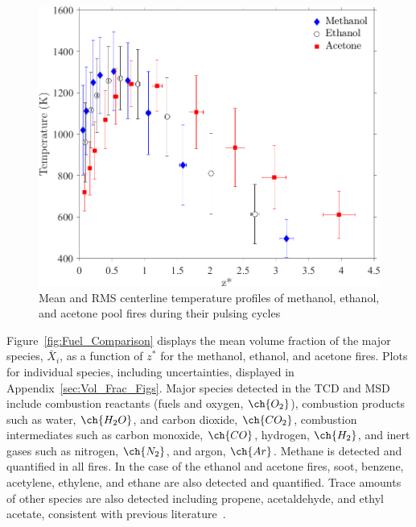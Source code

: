 \documentclass[12pt]{article}
\begin{document}
\begin{figure}[h!]
	\centering
\includegraphics[width=11.0 cm, keepaspectratio]{Temperature_Comparison.png}
	\caption[Major Species Comparison]{Mean and RMS centerline temperature profiles of methanol, ethanol, and acetone pool fires during their pulsing cycles}
	\label{fig:Temp_Comparison}
\end{figure}

Figure~\ref{fig:Fuel_Comparison} displays the mean volume fraction of the major species, $\bar{X}_{i}$, as a function of $z^*$ for the methanol, ethanol, and acetone fires. Plots for individual species, including uncertainties, displayed in Appendix~\ref{sec:Vol_Frac_Figs}. Major species detected in the TCD and MSD include combustion reactants (fuels and oxygen, $\ch{O_2}$), combustion products such as water, $\ch{H_{2}O}$, and carbon dioxide, $\ch{CO_{2}}$, combustion intermediates such as carbon monoxide, $\ch{CO}$, hydrogen, $\ch{H_{2}}$, and inert gases such as nitrogen, $\ch{N_{2}}$, and argon, $\ch{Ar}$. Methane is detected and quantified in all fires. In the case of the ethanol and acetone fires, soot, benzene, acetylene, ethylene, and ethane are also detected and quantified. Trace amounts of other species are also detected including propene, acetaldehyde, and ethyl acetate, consistent with previous literature~\cite{Pichon2009, Gong2015}.
\end{document}
